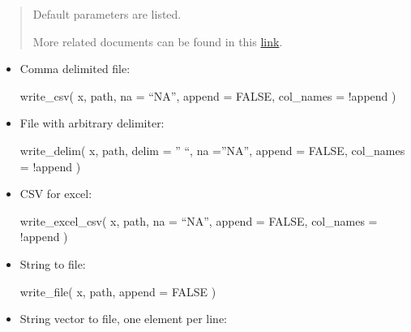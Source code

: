 \documentclass[
]{article}
\newenvironment{Shaded}{}{}
\newcommand{\AttributeTok}[1]{\textcolor[rgb]{0.49,0.56,0.16}{#1}}
\newcommand{\ConstantTok}[1]{\textcolor[rgb]{0.53,0.00,0.00}{#1}}
\newcommand{\FunctionTok}[1]{\textcolor[rgb]{0.02,0.16,0.49}{#1}}
\newcommand{\NormalTok}[1]{#1}
\newcommand{\SpecialCharTok}[1]{\textcolor[rgb]{0.25,0.44,0.63}{#1}}
\begin{document}
\begin{quote}
Default parameters are listed.

More related documents can be found in this
\href{https://r4ds.had.co.nz/data-import.html?q=file\#writing-to-a-file}{link}.
\end{quote}

\begin{itemize}
\item
  Comma delimited file:

\begin{Shaded}
\begin{Highlighting}[]
\FunctionTok{write\_csv}\NormalTok{(}
\NormalTok{  x, }
\NormalTok{  path, }
  \AttributeTok{na =}\NormalTok{ “NA”, }
  \AttributeTok{append =} \ConstantTok{FALSE}\NormalTok{, }
  \AttributeTok{col\_names =} \SpecialCharTok{!}\NormalTok{append}
\NormalTok{) }
\end{Highlighting}
\end{Shaded}
\item
  File with arbitrary delimiter:

\begin{Shaded}
\begin{Highlighting}[]
\FunctionTok{write\_delim}\NormalTok{(}
\NormalTok{  x, }
\NormalTok{  path, }
  \AttributeTok{delim =}\NormalTok{ ” “, }
  \AttributeTok{na =}\NormalTok{”NA”, }
  \AttributeTok{append =} \ConstantTok{FALSE}\NormalTok{, }
  \AttributeTok{col\_names =} \SpecialCharTok{!}\NormalTok{append}
\NormalTok{)}
\end{Highlighting}
\end{Shaded}
\item
  CSV for excel:

\begin{Shaded}
\begin{Highlighting}[]
\FunctionTok{write\_excel\_csv}\NormalTok{(}
\NormalTok{  x, }
\NormalTok{  path, }
  \AttributeTok{na =}\NormalTok{ “NA”, }
  \AttributeTok{append =} \ConstantTok{FALSE}\NormalTok{,}
  \AttributeTok{col\_names =} \SpecialCharTok{!}\NormalTok{append}
\NormalTok{) }
\end{Highlighting}
\end{Shaded}
\item
  String to file:

\begin{Shaded}
\begin{Highlighting}[]
\FunctionTok{write\_file}\NormalTok{(}
\NormalTok{  x,}
\NormalTok{  path, }
  \AttributeTok{append =} \ConstantTok{FALSE}
\NormalTok{)}
\end{Highlighting}
\end{Shaded}
\item
  String vector to file, one element per line:


\end{itemize}
\end{document}
